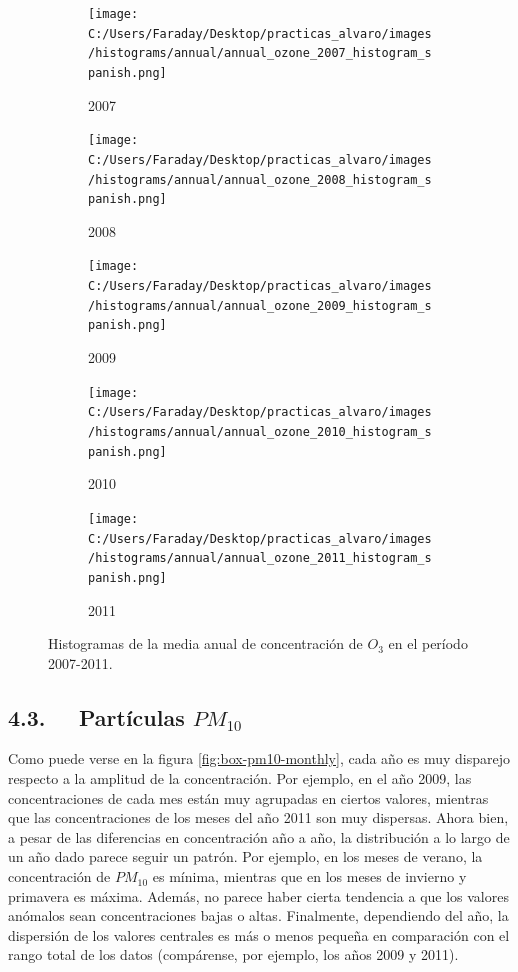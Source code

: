 \documentclass[12pt]{article}
\begin{document}
\begin{figure}[H]

\centering
\begin{subfigure}[H]{0.45\textwidth}
\texttt{[image: C:/Users/Faraday/Desktop/practicas\_alvaro/images/histograms/annual/annual\_ozone\_2007\_histogram\_spanish.png]}
\captionsetup{labelformat=empty}
\caption{2007}
\end{subfigure}
%
\begin{subfigure}[H]{0.45\textwidth}
\texttt{[image: C:/Users/Faraday/Desktop/practicas\_alvaro/images/histograms/annual/annual\_ozone\_2008\_histogram\_spanish.png]}
\captionsetup{labelformat=empty}
\caption{2008}
\end{subfigure}

\begin{subfigure}[H]{0.45\textwidth}
\texttt{[image: C:/Users/Faraday/Desktop/practicas\_alvaro/images/histograms/annual/annual\_ozone\_2009\_histogram\_spanish.png]}
\captionsetup{labelformat=empty}
\caption{2009}
\end{subfigure}
%
\begin{subfigure}[H]{0.45\textwidth}
\texttt{[image: C:/Users/Faraday/Desktop/practicas\_alvaro/images/histograms/annual/annual\_ozone\_2010\_histogram\_spanish.png]}
\captionsetup{labelformat=empty}
\caption{2010}
\end{subfigure}

\begin{subfigure}[H]{0.45\textwidth}
\texttt{[image: C:/Users/Faraday/Desktop/practicas\_alvaro/images/histograms/annual/annual\_ozone\_2011\_histogram\_spanish.png]}
\captionsetup{labelformat=empty}
\caption{2011}
\end{subfigure}

\vspace*{-3mm}
\caption{Histogramas de la media anual de concentración de $O_{3}$ en el período 2007-2011.}
\label{fig:hist-ozone-anual}
\end{figure}

\subsection*{4.3. $\>$ $\>$ Partículas \textbf{\texorpdfstring{$PM_{10}$}{PM10}}}
%

Como puede verse en la figura \ref{fig:box-pm10-monthly}, cada año es muy disparejo respecto a la amplitud de la concentración. Por ejemplo, en el año 2009, las concentraciones de cada mes están muy agrupadas en ciertos valores, mientras que las concentraciones de los meses del año 2011 son muy dispersas. Ahora bien, a pesar de las diferencias en concentración año a año, la distribución a lo largo de un año dado parece seguir un patrón. Por ejemplo, en los meses de verano, la concentración de $PM_{10}$ es mínima, mientras que en los meses de invierno y primavera es máxima. Además, no parece haber cierta tendencia a que los valores anómalos sean concentraciones bajas o altas. Finalmente, dependiendo del año, la dispersión de los valores centrales es más o menos pequeña en comparación con el rango total de los datos (compárense, por ejemplo, los años 2009 y 2011).
\end{document}
